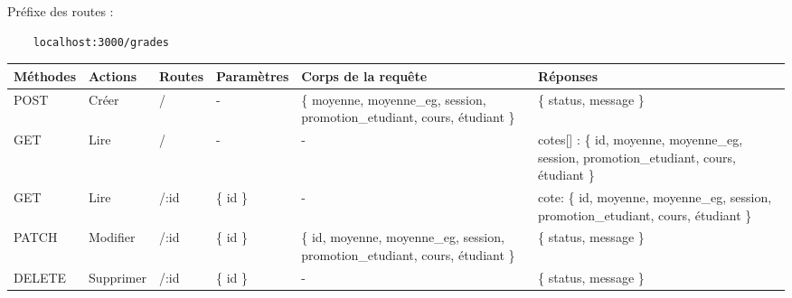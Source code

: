 Préfixe des routes :
\begin{lstlisting}
    localhost:3000/grades
\end{lstlisting}

\begin{center}
    \begin{tabularx}{1\textwidth} {
            | >{\raggedright\arraybackslash}X
            | >{\centering\arraybackslash}X
            | >{\centering\arraybackslash}X
            | >{\centering\arraybackslash}X
            | >{\centering\arraybackslash}X
            | >{\raggedleft\arraybackslash}X |
        }
        \hline
            Méthodes & Actions & Routes & Paramètres & Corps de la requête & Réponses \\
        \hline
            POST  & Créer & / &  - & \{ moyenne, moyenne\_eg, session, promotion\_etudiant, cours, étudiant \} & \{ status, message \} \\
        \hline
            GET  & Lire &  / & - & - & cotes[] :  \{ id, moyenne, moyenne\_eg, session, promotion\_etudiant, cours, étudiant \} \\
        \hline
            GET  & Lire & /:id & \{ id \} & - & cote: \{ id, moyenne, moyenne\_eg, session, promotion\_etudiant, cours, étudiant \} \\
        \hline
            PATCH  & Modifier & /:id & \{ id \} & \{ id, moyenne, moyenne\_eg, session, promotion\_etudiant, cours, étudiant \} & \{ status, message \} \\
        \hline
            DELETE & Supprimer  & /:id & \{ id \} & - & \{ status, message \} \\
        \hline
    \end{tabularx}
\end{center}
\pagebreak